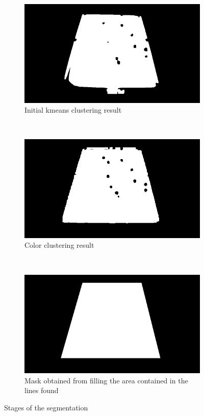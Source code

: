 \begin{figure}[h]
    \centering
    \begin{subfigure}[b]{0.75\textwidth}
        \includegraphics[width=\textwidth]{./imgs/kmeans_cluster.png}
        \caption{Initial kmeans clustering result}
        \label{fig:kmeanstabol}
    \end{subfigure}
    \\
    \begin{subfigure}[b]{0.75\textwidth}
        \includegraphics[width=\textwidth]{./imgs/color_cluster.png}
        \caption{Color clustering result}
        \label{fig:colorsegtabol}
    \end{subfigure}
    \\
    \begin{subfigure}[b]{0.75\textwidth}
        \includegraphics[width=\textwidth]{./imgs/maskfill.png}
        \caption{Mask obtained from filling the area contained in the lines found}
        \label{fig:finalsegtabol}
    \end{subfigure}
    \caption{Stages of the segmentation}
    \vspace{30pt}
\end{figure}
